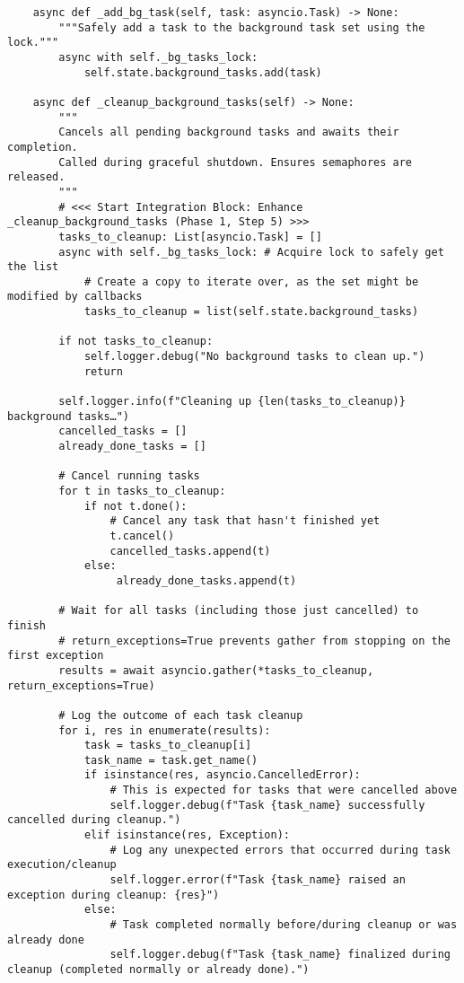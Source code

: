 \documentclass[12pt,a4paper]{article}
\begin{document}
\begin{pageablecode}
\begin{verbatim}
    async def _add_bg_task(self, task: asyncio.Task) -> None:
        """Safely add a task to the background task set using the lock."""
        async with self._bg_tasks_lock:
            self.state.background_tasks.add(task)

    async def _cleanup_background_tasks(self) -> None:
        """
        Cancels all pending background tasks and awaits their completion.
        Called during graceful shutdown. Ensures semaphores are released.
        """
        # <<< Start Integration Block: Enhance _cleanup_background_tasks (Phase 1, Step 5) >>>
        tasks_to_cleanup: List[asyncio.Task] = []
        async with self._bg_tasks_lock: # Acquire lock to safely get the list
            # Create a copy to iterate over, as the set might be modified by callbacks
            tasks_to_cleanup = list(self.state.background_tasks)

        if not tasks_to_cleanup:
            self.logger.debug("No background tasks to clean up.")
            return

        self.logger.info(f"Cleaning up {len(tasks_to_cleanup)} background tasks…")
        cancelled_tasks = []
        already_done_tasks = []

        # Cancel running tasks
        for t in tasks_to_cleanup:
            if not t.done():
                # Cancel any task that hasn't finished yet
                t.cancel()
                cancelled_tasks.append(t)
            else:
                 already_done_tasks.append(t)

        # Wait for all tasks (including those just cancelled) to finish
        # return_exceptions=True prevents gather from stopping on the first exception
        results = await asyncio.gather(*tasks_to_cleanup, return_exceptions=True)

        # Log the outcome of each task cleanup
        for i, res in enumerate(results):
            task = tasks_to_cleanup[i]
            task_name = task.get_name()
            if isinstance(res, asyncio.CancelledError):
                # This is expected for tasks that were cancelled above
                self.logger.debug(f"Task {task_name} successfully cancelled during cleanup.")
            elif isinstance(res, Exception):
                # Log any unexpected errors that occurred during task execution/cleanup
                self.logger.error(f"Task {task_name} raised an exception during cleanup: {res}")
            else:
                # Task completed normally before/during cleanup or was already done
                self.logger.debug(f"Task {task_name} finalized during cleanup (completed normally or already done).")


\end{verbatim}
\end{pageablecode}
\end{document}
